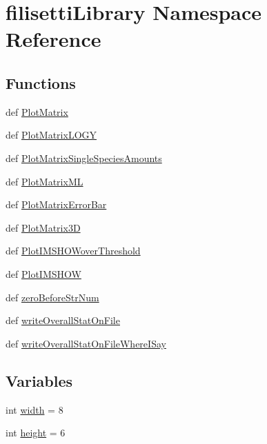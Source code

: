 \hypertarget{namespacefilisetti_library}{\section{filisetti\-Library \-Namespace \-Reference}
\label{namespacefilisetti_library}
}
\subsection*{\-Functions}
\begin{DoxyCompactItemize}
\item 
def \hyperlink{namespacefilisetti_library_a3c260c8d11db02499778f164fa3ccfe9}{\-Plot\-Matrix}
\item 
def \hyperlink{namespacefilisetti_library_a6a1c8b5bfe837ac12fd6b41c4c9fecb3}{\-Plot\-Matrix\-L\-O\-G\-Y}
\item 
def \hyperlink{namespacefilisetti_library_a0eb17f6682fabd10acb1025a96040fe2}{\-Plot\-Matrix\-Single\-Species\-Amounts}
\item 
def \hyperlink{namespacefilisetti_library_ae2e921c1fc30e80a555d96e5cf659ff2}{\-Plot\-Matrix\-M\-L}
\item 
def \hyperlink{namespacefilisetti_library_abb475acf40c8f60da991013d7ddbee5a}{\-Plot\-Matrix\-Error\-Bar}
\item 
def \hyperlink{namespacefilisetti_library_a22c71b74962e8175c0b00f0dab69f15b}{\-Plot\-Matrix3\-D}
\item 
def \hyperlink{namespacefilisetti_library_ae73db200d1863cd8be0c73c61d114bb9}{\-Plot\-I\-M\-S\-H\-O\-Wover\-Threshold}
\item 
def \hyperlink{namespacefilisetti_library_a5bcbb5145bed412a2bce9627e70b1aee}{\-Plot\-I\-M\-S\-H\-O\-W}
\item 
def \hyperlink{namespacefilisetti_library_a014dd4c50d3cbc2cf0a3c11f9b8de5ae}{zero\-Before\-Str\-Num}
\item 
def \hyperlink{namespacefilisetti_library_ae3ba725da6eaf6bcf202c0dafc445414}{write\-Overall\-Stat\-On\-File}
\item 
def \hyperlink{namespacefilisetti_library_a296429c499a8e6125c0f5d63eebe71a8}{write\-Overall\-Stat\-On\-File\-Where\-I\-Say}
\end{DoxyCompactItemize}
\subsection*{\-Variables}
\begin{DoxyCompactItemize}
\item 
int \hyperlink{namespacefilisetti_library_a5a12655d430f8c004af413e255dff4bc}{width} = 8
\item 
int \hyperlink{namespacefilisetti_library_a0dd9d0f4fa4bf1c5453ff6955bbdeb28}{height} = 6
\end{DoxyCompactItemize}


